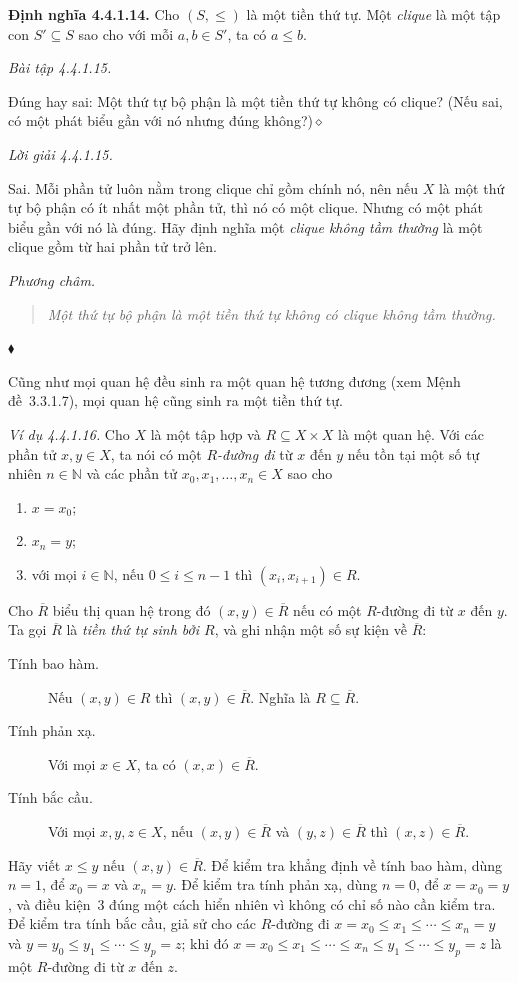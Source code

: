 \noindent\textbf{Định nghĩa 4.4.1.14.} Cho $(S,\le)$ là một tiền thứ tự. Một \emph{clique} là một tập con $S'\subseteq S$ sao cho với mỗi $a,b\in S'$, ta có $a\le b$.

\noindent\textit{Bài tập 4.4.1.15.}\keepwithnext

Đúng hay sai: Một thứ tự bộ phận là một tiền thứ tự không có clique? (Nếu sai, có một phát biểu gần với nó nhưng đúng không?)\hfill$\diamond$

\noindent\textit{Lời giải 4.4.1.15.}\keepwithnext

Sai. Mỗi phần tử luôn nằm trong clique chỉ gồm chính nó, nên nếu $X$ là một thứ tự bộ phận có ít nhất một phần tử, thì nó có một clique. Nhưng có một phát biểu gần với nó là đúng. Hãy định nghĩa một \emph{clique không tầm thường} là một clique gồm từ hai phần tử trở lên.

\noindent\textit{Phương châm.}
\begin{samepage}
\begin{quote}\emph{Một thứ tự bộ phận là một tiền thứ tự không có clique không tầm thường.}\end{quote}
\hfill$\blacklozenge$
\end{samepage}

Cũng như mọi quan hệ đều sinh ra một quan hệ tương đương (xem Mệnh đề~3.3.1.7), mọi quan hệ cũng sinh ra một tiền thứ tự.

\noindent\textit{Ví dụ 4.4.1.16.} Cho $X$ là một tập hợp và $R\subseteq X\times X$ là một quan hệ. Với các phần tử $x,y\in X$, ta nói có một \emph{$R$-đường đi} từ $x$ đến $y$ nếu tồn tại một số tự nhiên $n\in\mathbb{N}$ và các phần tử $x_0,x_1,\ldots,x_n\in X$ sao cho
\begin{enumerate}
\item $x=x_0$;
\item $x_n=y$;
\item với mọi $i\in\mathbb{N}$, nếu $0\le i\le n-1$ thì $(x_i,x_{i+1})\in R$.
\end{enumerate}
Cho $\overline{R}$ biểu thị quan hệ trong đó $(x,y)\in\overline{R}$ nếu có một $R$-đường đi từ $x$ đến $y$. Ta gọi $\overline{R}$ là \emph{tiền thứ tự sinh bởi $R$}, và ghi nhận một số sự kiện về $\overline{R}$:
\begin{description}
\item[Tính bao hàm.] Nếu $(x,y)\in R$ thì $(x,y)\in\overline{R}$. Nghĩa là $R\subseteq\overline{R}$.
\item[Tính phản xạ.] Với mọi $x\in X$, ta có $(x,x)\in\overline{R}$.
\item[Tính bắc cầu.] Với mọi $x,y,z\in X$, nếu $(x,y)\in\overline{R}$ và $(y,z)\in\overline{R}$ thì $(x,z)\in\overline{R}$.
\end{description}
Hãy viết $x\le y$ nếu $(x,y)\in\overline{R}$. Để kiểm tra khẳng định về tính bao hàm, dùng $n=1$, để $x_0=x$ và $x_n=y$. Để kiểm tra tính phản xạ, dùng $n=0$, để $x=x_0=y$, và điều kiện~3 đúng một cách hiển nhiên vì không có chỉ số nào cần kiểm tra. Để kiểm tra tính bắc cầu, giả sử cho các $R$-đường đi $x=x_0\le x_1\le\cdots\le x_n=y$ và $y=y_0\le y_1\le\cdots\le y_p=z$; khi đó $x=x_0\le x_1\le\cdots\le x_n\le y_1\le\cdots\le y_p=z$ là một $R$-đường đi từ $x$ đến $z$.

